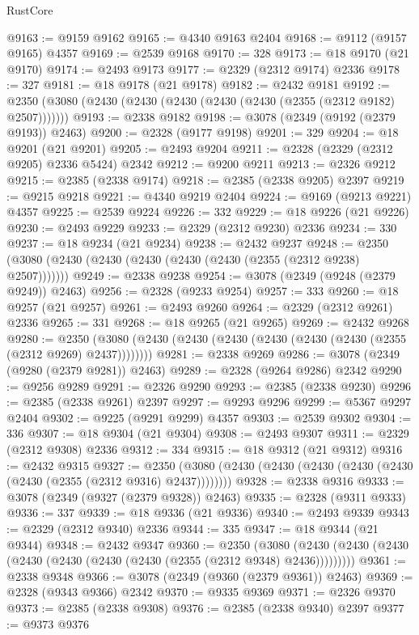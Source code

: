 \begin{lexlean}{RustCore}
\begin{coremodule}
@9163 := @9159 @9162
@9165 := @4340 @9163 @2404
@9168 := @9112 (@9157 @9165) @4357
@9169 := @2539 @9168
@9170 := 328
@9173 := @18 @9170 (@21 @9170)
@9174 := @2493 @9173
@9177 := @2329 (@2312 @9174) @2336
@9178 := 327
@9181 := @18 @9178 (@21 @9178)
@9182 := @2432 @9181
@9192 := @2350 (@3080 (@2430 (@2430 (@2430 (@2430 (@2430 (@2355 (@2312 @9182) @2507)))))))
@9193 := @2338 @9182
@9198 := @3078 (@2349 (@9192 (@2379 @9193)) @2463)
@9200 := @2328 (@9177 @9198)
@9201 := 329
@9204 := @18 @9201 (@21 @9201)
@9205 := @2493 @9204
@9211 := @2328 (@2329 (@2312 @9205) @2336 @5424) @2342
@9212 := @9200 @9211
@9213 := @2326 @9212
@9215 := @2385 (@2338 @9174)
@9218 := @2385 (@2338 @9205) @2397
@9219 := @9215 @9218
@9221 := @4340 @9219 @2404
@9224 := @9169 (@9213 @9221) @4357
@9225 := @2539 @9224
@9226 := 332
@9229 := @18 @9226 (@21 @9226)
@9230 := @2493 @9229
@9233 := @2329 (@2312 @9230) @2336
@9234 := 330
@9237 := @18 @9234 (@21 @9234)
@9238 := @2432 @9237
@9248 := @2350 (@3080 (@2430 (@2430 (@2430 (@2430 (@2430 (@2355 (@2312 @9238) @2507)))))))
@9249 := @2338 @9238
@9254 := @3078 (@2349 (@9248 (@2379 @9249)) @2463)
@9256 := @2328 (@9233 @9254)
@9257 := 333
@9260 := @18 @9257 (@21 @9257)
@9261 := @2493 @9260
@9264 := @2329 (@2312 @9261) @2336
@9265 := 331
@9268 := @18 @9265 (@21 @9265)
@9269 := @2432 @9268
@9280 := @2350 (@3080 (@2430 (@2430 (@2430 (@2430 (@2430 (@2430 (@2355 (@2312 @9269) @2437))))))))
@9281 := @2338 @9269
@9286 := @3078 (@2349 (@9280 (@2379 @9281)) @2463)
@9289 := @2328 (@9264 @9286) @2342
@9290 := @9256 @9289
@9291 := @2326 @9290
@9293 := @2385 (@2338 @9230)
@9296 := @2385 (@2338 @9261) @2397
@9297 := @9293 @9296
@9299 := @5367 @9297 @2404
@9302 := @9225 (@9291 @9299) @4357
@9303 := @2539 @9302
@9304 := 336
@9307 := @18 @9304 (@21 @9304)
@9308 := @2493 @9307
@9311 := @2329 (@2312 @9308) @2336
@9312 := 334
@9315 := @18 @9312 (@21 @9312)
@9316 := @2432 @9315
@9327 := @2350 (@3080 (@2430 (@2430 (@2430 (@2430 (@2430 (@2430 (@2355 (@2312 @9316) @2437))))))))
@9328 := @2338 @9316
@9333 := @3078 (@2349 (@9327 (@2379 @9328)) @2463)
@9335 := @2328 (@9311 @9333)
@9336 := 337
@9339 := @18 @9336 (@21 @9336)
@9340 := @2493 @9339
@9343 := @2329 (@2312 @9340) @2336
@9344 := 335
@9347 := @18 @9344 (@21 @9344)
@9348 := @2432 @9347
@9360 := @2350
    (@3080 (@2430 (@2430 (@2430 (@2430 (@2430 (@2430 (@2430 (@2355 (@2312 @9348) @2436)))))))))
@9361 := @2338 @9348
@9366 := @3078 (@2349 (@9360 (@2379 @9361)) @2463)
@9369 := @2328 (@9343 @9366) @2342
@9370 := @9335 @9369
@9371 := @2326 @9370
@9373 := @2385 (@2338 @9308)
@9376 := @2385 (@2338 @9340) @2397
@9377 := @9373 @9376

\end{coremodule}
\end{lexlean}

